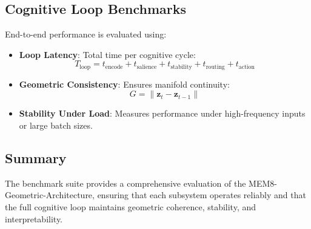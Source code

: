 \subsection{Cognitive Loop Benchmarks}

End-to-end performance is evaluated using:

\begin{itemize}
\item \textbf{Loop Latency}: Total time per cognitive cycle:
\[
T_{\mathrm{loop}} = t_{\mathrm{encode}} + t_{\mathrm{salience}} +
t_{\mathrm{stability}} + t_{\mathrm{routing}} + t_{\mathrm{action}}
\]

\item \textbf{Geometric Consistency}: Ensures manifold continuity:
\[
G = \|\mathbf{z}_{t} - \mathbf{z}_{t-1}\|
\]

\item \textbf{Stability Under Load}: Measures performance under high-frequency
inputs or large batch sizes.
\end{itemize}

\subsection{Summary}

The benchmark suite provides a comprehensive evaluation of the
MEM8-Geometric-Architecture, ensuring that each subsystem operates reliably and
that the full cognitive loop maintains geometric coherence, stability, and
interpretability.
